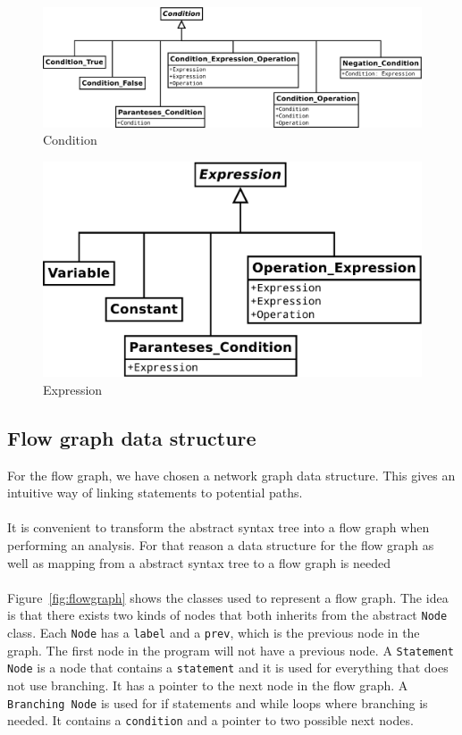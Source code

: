 \begin{figure}[h]
	\centering
	\includegraphics[scale=.3]{../fig/Condition}
	\caption{Condition}
	\label{fig:condition}
\end{figure}

\begin{figure}[h]
	\centering
	\includegraphics[scale=.3]{../fig/Expression}
	\caption{Expression}
	\label{fig:expression}
\end{figure}

\subsection{Flow graph data structure}
\label{sec:constructing_flow_graphs}
For the flow graph, we have chosen a network graph data structure. This gives an intuitive way of linking statements to potential paths.
\\
\\
It is convenient to transform the abstract syntax tree into a flow graph when performing an analysis. For that reason a data structure for the flow graph as well as mapping from a abstract syntax tree to a flow graph is needed 
\\
\\
Figure~\ref{fig:flowgraph} shows the classes used to represent a flow graph. The idea is that there exists two kinds of nodes that both inherits from the abstract \texttt{Node} class. Each \texttt{Node} has a \texttt{label} and a \texttt{prev}, which is the previous node in the graph. The first node in the program will not have a previous node. A \texttt{Statement Node} is a node that contains a \texttt{statement} and it is used for everything that does not use branching. It has a pointer to the next node in the flow graph. A \texttt{Branching Node} is used for if statements and while loops where branching is needed. It contains a \texttt{condition} and a pointer to two possible next nodes.

